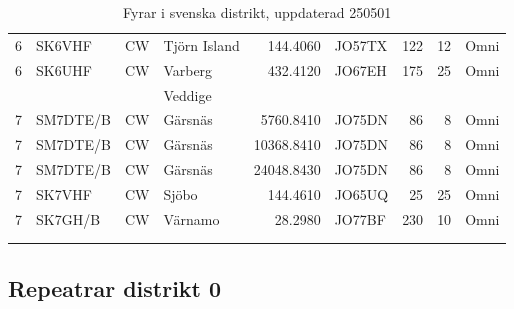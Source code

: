\begin{longtable}{rlllrlrrl}
6        & SK6VHF     & CW       & Tjörn Island & 144.4060     & JO57TX      & 122      & 12       & Omni         \\
6        & SK6UHF     & CW       & Varberg      & 432.4120     & JO67EH      & 175      & 25       & Omni         \\
         &            &          & Veddige      &              &             &          &          &              \\
7        & SM7DTE/B   & CW       & Gärsnäs      & 5760.8410    & JO75DN      & 86       & 8        & Omni         \\
7        & SM7DTE/B   & CW       & Gärsnäs      & 10368.8410   & JO75DN      & 86       & 8        & Omni         \\
7        & SM7DTE/B   & CW       & Gärsnäs      & 24048.8430   & JO75DN      & 86       & 8        & Omni         \\
7        & SK7VHF     & CW       & Sjöbo        & 144.4610     & JO65UQ      & 25       & 25       & Omni         \\
7        & SK7GH/B    & CW       & Värnamo      & 28.2980      & JO77BF      & 230      & 10       & Omni         \\
\vspace{1 ex}                                                                                                     \\
\caption{Fyrar i svenska distrikt, uppdaterad 250501}                                                             \\
\end{longtable}

\clearpage

\subsection{Repeatrar distrikt 0}

